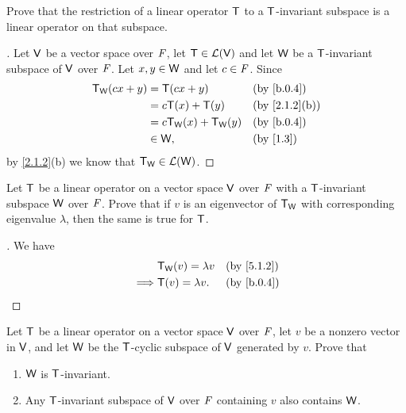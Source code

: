 \setcounter{ex}{6}
\begin{ex}\label{ex:5.4.7}
  Prove that the restriction of a linear operator \(\mathsf{T}\) to a \(\mathsf{T}\)-invariant subspace is a linear operator on that subspace.
\end{ex}

\begin{proof}[]
  Let \(\mathsf{V}\) be a vector space over \(\mathit{F}\), let \(\mathsf{T} \in \mathcal{L}(\mathsf{V})\) and let \(\mathsf{W}\) be a \(\mathsf{T}\)-invariant subspace of \(\mathsf{V}\) over \(\mathit{F}\).
  Let \(x, y \in \mathsf{W}\) and let \(c \in \mathit{F}\).
  Since
  \begin{align*}
    \T_{\W}(cx + y) & = \T(cx + y)                &  & \text{(by \cref{b.0.4})}    \\
                    & = c \T(x) + \T(y)           &  & \text{(by \cref{2.1.2}(b))} \\
                    & = c \T_{\W}(x) + \T_{\W}(y) &  & \text{(by \cref{b.0.4})}    \\
                    & \in \W,                     &  & \text{(by \cref{1.3})}
  \end{align*}
  by \cref{2.1.2}(b) we know that \(\mathsf{T}_{\mathsf{W}} \in \mathcal{L}(\mathsf{W})\).
\end{proof}

\begin{ex}\label{ex:5.4.8}
  Let \(\mathsf{T}\) be a linear operator on a vector space \(\mathsf{V}\) over \(\mathit{F}\) with a \(\mathsf{T}\)-invariant subspace \(\mathsf{W}\) over \(\mathit{F}\).
  Prove that if \(v\) is an eigenvector of \(\mathsf{T}_{\mathsf{W}}\) with corresponding eigenvalue \(\lambda\), then the same is true for \(\mathsf{T}\).
\end{ex}

\begin{proof}[]
  We have
  \begin{align*}
             & \T_{\W}(v) = \lambda v &  & \text{(by \cref{5.1.2})} \\
    \implies & \T(v) = \lambda v.     &  & \text{(by \cref{b.0.4})}
  \end{align*}
\end{proof}

\setcounter{ex}{10}
\begin{ex}\label{ex:5.4.11}
  Let \(\mathsf{T}\) be a linear operator on a vector space \(\mathsf{V}\) over \(\mathit{F}\), let \(v\) be a nonzero vector in \(\mathsf{V}\), and let \(\mathsf{W}\) be the \(\mathsf{T}\)-cyclic subspace of \(\mathsf{V}\) generated by \(v\).
  Prove that
  \begin{enumerate}
    \item \(\mathsf{W}\) is \(\mathsf{T}\)-invariant.
    \item Any \(\mathsf{T}\)-invariant subspace of \(\mathsf{V}\) over \(\mathit{F}\) containing \(v\) also contains \(\mathsf{W}\).
  \end{enumerate}
\end{ex}

